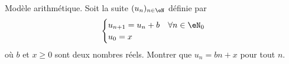 


\begin{exercice}\label{exoTD3-0004}

	Modèle arithmétique. Soit la suite $(u_n)_{n\in\eN}$ définie par
	\begin{equation}
		\begin{cases}
			u_{n+1}=u_n+b	&	\text{}\forall n\in\eN_0\\
			u_0=x
		\end{cases}
	\end{equation}
	où $b$ et $x\geq 0$ sont deux nombres réels. Montrer que $u_n=bn+x$ pour tout $n$.

\end{exercice}
